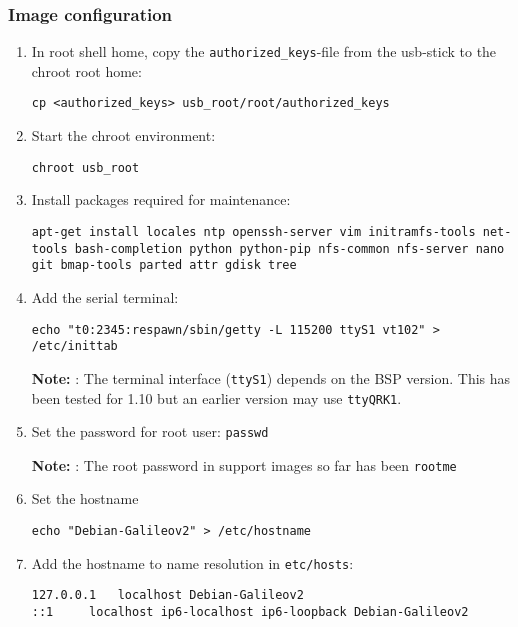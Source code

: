 \documentclass[a4paper,11pt]{article}
\newcommand{\note}{\textbf{Note: }}
\newcommand{\cmd}[1]{\texttt{#1}}
\begin{document}
\subsubsection*{Image configuration}
\begin{enumerate}
\item In root shell home, copy the \cmd{authorized\_keys}-file from the usb-stick to the chroot root home: 
\begin{lstlisting}
cp <authorized_keys> usb_root/root/authorized_keys
\end{lstlisting}

\item Start the chroot environment: 
\begin{lstlisting}
chroot usb_root
\end{lstlisting}

\item Install packages required for maintenance: 
\begin{lstlisting}
apt-get install locales ntp openssh-server vim initramfs-tools net-tools bash-completion python python-pip nfs-common nfs-server nano git bmap-tools parted attr gdisk tree
\end{lstlisting}

\item Add the serial terminal: 
\begin{lstlisting}
echo "t0:2345:respawn/sbin/getty -L 115200 ttyS1 vt102" > /etc/inittab
\end{lstlisting}

\note: The terminal interface (\cmd{ttyS1}) depends on the BSP version. This has been tested for 1.10 but an earlier version may use \cmd{ttyQRK1}.

\item Set the password for root user: \cmd{passwd}

\note: The root password in support images so far has been \cmd{rootme}

\item Set the hostname 
\begin{lstlisting}
echo "Debian-Galileov2" > /etc/hostname
\end{lstlisting}

\item Add the hostname to name resolution in \cmd{etc/hosts}:
\begin{lstlisting}
127.0.0.1	localhost Debian-Galileov2
::1		localhost ip6-localhost ip6-loopback Debian-Galileov2
\end{lstlisting}


\end{enumerate}
\end{document}
